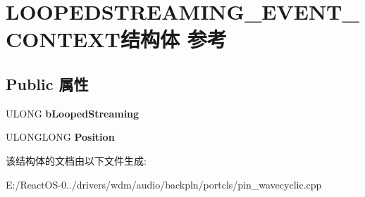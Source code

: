 \hypertarget{struct_l_o_o_p_e_d_s_t_r_e_a_m_i_n_g___e_v_e_n_t___c_o_n_t_e_x_t}{}\section{L\+O\+O\+P\+E\+D\+S\+T\+R\+E\+A\+M\+I\+N\+G\+\_\+\+E\+V\+E\+N\+T\+\_\+\+C\+O\+N\+T\+E\+X\+T结构体 参考}
\label{struct_l_o_o_p_e_d_s_t_r_e_a_m_i_n_g___e_v_e_n_t___c_o_n_t_e_x_t}
\subsection*{Public 属性}
\begin{DoxyCompactItemize}
\item 
\mbox{\label{struct_l_o_o_p_e_d_s_t_r_e_a_m_i_n_g___e_v_e_n_t___c_o_n_t_e_x_t_a7d4a4c2719c103a06c16044708af4c29}} 
U\+L\+O\+NG {\bfseries b\+Looped\+Streaming}
\item 
\mbox{\label{struct_l_o_o_p_e_d_s_t_r_e_a_m_i_n_g___e_v_e_n_t___c_o_n_t_e_x_t_af4e3aafa4aca104bff4b104954d626bd}} 
U\+L\+O\+N\+G\+L\+O\+NG {\bfseries Position}
\end{DoxyCompactItemize}


该结构体的文档由以下文件生成\+:\begin{DoxyCompactItemize}
\item 
E\+:/\+React\+O\+S-\/0../drivers/wdm/audio/backpln/portcls/pin\+\_\+wavecyclic.\+cpp\end{DoxyCompactItemize}
